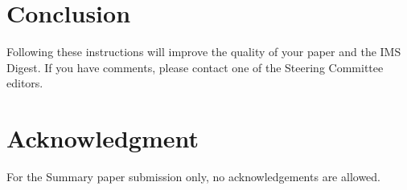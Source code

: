\documentclass[conference]{IEEEtran}
\begin{document}
{%
%

\section{Conclusion}
Following these instructions will improve the quality of your paper and the IMS Digest. If you have comments, please contact one of the Steering Committee editors.


\section*{Acknowledgment}
For the Summary paper submission only, no acknowledgements are allowed. 




}
\end{document}
